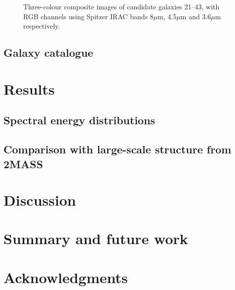 \documentclass[times,usenatbib]{mn2e}
\begin{document}
\begin{figure}
\begin{center}
\caption{Three-colour composite images of candidate galaxies 21--43, with RGB channels using Spitzer IRAC bands 8$\mu$m, 4.5$\mu$m and 3.6$\mu$m respectively.}
\label{gallery2}
\end{center}
\end{figure} 

\subsection{Galaxy catalogue}

\section{Results}

\subsection{Spectral energy distributions}

\subsection{Comparison with large-scale structure from 2MASS}

\section{Discussion}

\section{Summary and future work}

\section*{Acknowledgments}
\end{document}
